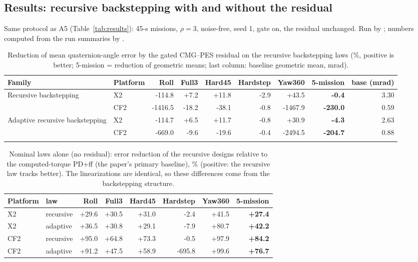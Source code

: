 \subsection{Results: recursive backstepping with and without the residual}
Same protocol as A5 (Table~\ref{tab:results}): 45-s missions, $\rho=3$, noise-free, seed 1, gate on, the residual unchanged. Run by ; numbers computed from the run summaries by .
\begin{table}[H]\centering\small
\caption{Reduction of mean quaternion-angle error by the gated CMG--PES residual on the recursive backstepping laws (\%, positive is better; 5-mission = reduction of geometric means; last column: baseline geometric mean, mrad).}\label{tab:bsres}
\begin{tabular}{@{}llrrrrrrr@{}}\toprule
Family & Platform & Roll & Full3 & Hard45 & Hardstep & Yaw360 & 5-mission & base (mrad)\\\midrule
Recursive backstepping & X2 & -114.8 & +7.2 & +11.8 & -2.9 & +43.5 & \textbf{-0.4} & 3.30\\
 & CF2 & -1416.5 & -18.2 & -38.1 & -0.8 & -1467.9 & \textbf{-230.0} & 0.59\\\addlinespace
Adaptive recursive backstepping & X2 & -114.7 & +6.5 & +11.7 & -0.8 & +30.9 & \textbf{-4.3} & 2.63\\
 & CF2 & -669.0 & -9.6 & -19.6 & -0.4 & -2494.5 & \textbf{-204.7} & 0.88\\\addlinespace
\bottomrule\end{tabular}\end{table}
\begin{table}[H]\centering\small
\caption{Nominal laws alone (no residual): error reduction of the recursive designs relative to the computed-torque PD+ff (the paper's primary baseline), \% (positive: the recursive law tracks better). The linearizations are identical, so these differences come from the backstepping structure.}\label{tab:bsvsct}
\begin{tabular}{@{}llrrrrrr@{}}\toprule
Platform & law & Roll & Full3 & Hard45 & Hardstep & Yaw360 & 5-mission\\\midrule
X2 & recursive & +29.6 & +30.5 & +31.0 & -2.4 & +41.5 & \textbf{+27.4}\\
X2 & adaptive & +36.5 & +30.8 & +29.1 & -7.9 & +80.7 & \textbf{+42.2}\\
CF2 & recursive & +95.0 & +64.8 & +73.3 & -0.5 & +97.9 & \textbf{+84.2}\\
CF2 & adaptive & +91.2 & +47.5 & +58.9 & -695.8 & +99.6 & \textbf{+76.7}\\
\bottomrule\end{tabular}\end{table}
